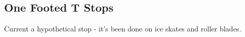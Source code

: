\subsection*{One Footed T Stops}
\label{drill:t_stop:one_foot}

Current a hypothetical stop - it's been done on ice skates and roller blades.  


